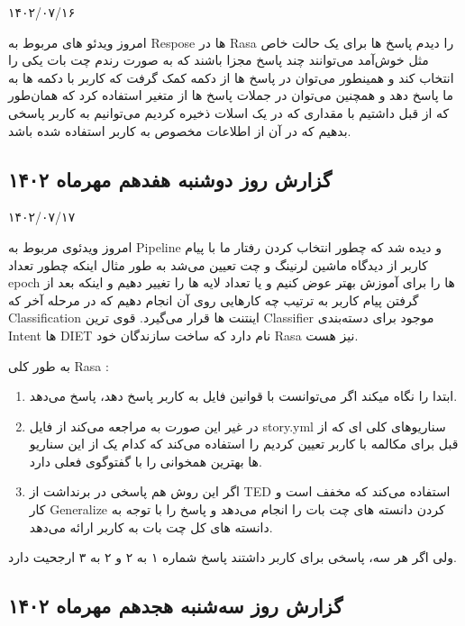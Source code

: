 ۱۴۰۲/۰۷/۱۶

امروز ویدئو های مربوط به Respose ها در Rasa را دیدم پاسخ ها برای یک حالت خاص مثل خوش‌آمد می‌توانند چند پاسخ مجزا باشند که به صورت رندم چت بات یکی را انتخاب کند و همینطور می‌توان در پاسخ ها از دکمه کمک گرفت که کاربر با دکمه ها به ما پاسخ دهد و همچنین می‌توان در جملات پاسخ ها از متغیر استفاده کرد که همان‌طور که از قبل داشتیم با مقداری که در یک اسلات ذخیره کردیم می‌توانیم به کاربر پاسخی بدهیم که در آن از اطلاعات مخصوص به کاربر استفاده شده باشد.


\subsection{گزارش روز دوشنبه هفدهم مهرماه ۱۴۰۲}

۱۴۰۲/۰۷/۱۷

امروز ویدئوی مربوط به Pipeline و  دیده شد که چطور انتخاب کردن رفتار ما با پیام کاربر از دیدگاه ماشین لرنینگ و   چت تعیین می‌شد به طور مثال اینکه چطور تعداد epoch ها را برای آموزش بهتر عوض کنیم و یا تعداد لایه ها را تغییر دهیم و اینکه بعد از گرفتن پیام کاربر به ترتیب چه کارهایی روی آن انجام دهیم که در مرحله آخر که Classification اینتنت ها قرار می‌گیرد. قوی ترین Classifier موجود برای دسته‌بندی Intent ها DIET نام دارد که ساخت سازندگان خود Rasa نیز هست.

به طور کلی Rasa :

\begin{enumerate}
    \item ابتدا  را نگاه میکند اگر می‌توانست با قوانین فایل به کاربر پاسخ دهد، پاسخ می‌دهد.
    \item در غیر این صورت به  مراجعه می‌کند از فایل story.yml سناریوهای کلی ای که از قبل برای مکالمه با کاربر تعیین کردیم را استفاده می‌کند که کدام یک از این سناریو ها بهترین همخوانی را با گفتوگوی فعلی دارد.
    \item اگر این روش هم پاسخی در برنداشت از TED استفاده می‌کند که مخفف  است و کار Generalize کردن دانسته های چت بات را انجام می‌دهد و پاسخ را با توجه به دانسته های کل چت بات به کاربر ارائه می‌دهد.
\end{enumerate}

ولی اگر هر سه، پاسخی برای کاربر داشتند پاسخ شماره ۱ به ۲ و ۲ به ۳ ارجحیت دارد.


\subsection{گزارش روز سه‌شنبه هجدهم مهرماه ۱۴۰۲}

